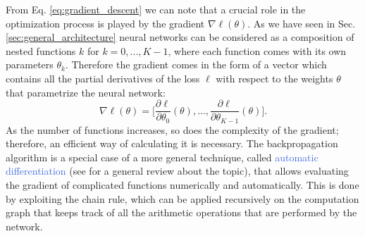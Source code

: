 From Eq. \ref{eq:gradient_descent} we can note that a crucial role in the optimization process is played by the gradient $\nabla\ell(\theta)$. As we have seen in Sec. \ref{sec:general_architecture} neural networks can be considered as a composition of nested functions $k$ for $k=0,...,K-1$, where each function comes with its own parameters $\theta_k$. Therefore the gradient comes in the form of a vector which contains all the partial derivatives of the loss $\ell$ with respect to the weights $\theta$ that parametrize the neural network:
\begin{equation}
	\nabla\ell(\theta) = \Big[\frac{\partial\ell}{\partial\theta_0}(\theta),...,\frac{\partial\ell}{\partial\theta_{K-1}}(\theta)\Big].
\end{equation}
As the number of functions increases, so does the complexity of the gradient; therefore, an efficient way of calculating it is necessary. The backpropagation algorithm \cite{linnainmaa1970representation,bryson1975applied,rumelhart1986learning} is a special case of a more general technique, called \textcolor{RoyalBlue}{automatic differentiation} (see \cite{baydin2018automatic} for a general review about the topic), that allows evaluating the gradient of complicated functions numerically and automatically. This is done by exploiting the chain rule, which can be applied recursively on the computation graph that keeps track of all the arithmetic operations that are performed by the network. 

